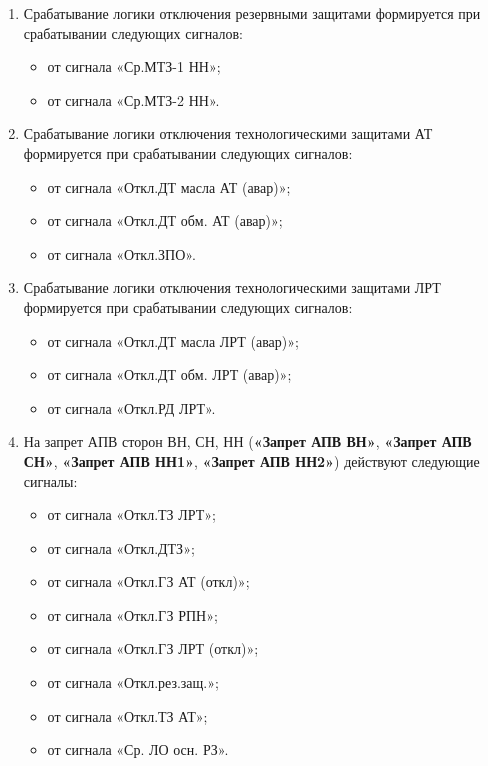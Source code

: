 \color{black}

\begin{enumerate}

\item
Срабатывание логики отключения резервными защитами формируется при срабатывании следующих сигналов:
\begin{itemize}
\item от сигнала «Ср.МТЗ-1 НН»;
\item от сигнала «Ср.МТЗ-2 НН».
\end{itemize}

\item
Срабатывание логики отключения технологическими защитами АТ формируется при срабатывании следующих сигналов:
\begin{itemize}
\item от сигнала «Откл.ДТ масла АТ (авар)»;
\item от сигнала «Откл.ДТ обм. АТ (авар)»;
\item от сигнала «Откл.ЗПО».
\end{itemize}

\item
Срабатывание логики отключения технологическими защитами ЛРТ формируется при срабатывании следующих сигналов:
\begin{itemize}
\item от сигнала «Откл.ДТ масла ЛРТ (авар)»;
\item от сигнала «Откл.ДТ обм. ЛРТ (авар)»;
\item от сигнала «Откл.РД ЛРТ».
\end{itemize}

\item
На запрет АПВ сторон ВН, СН, НН (\textbf{«Запрет АПВ ВН»}, \textbf{«Запрет АПВ СН»}, \textbf{«Запрет АПВ НН1»}, \textbf{«Запрет АПВ НН2»}) действуют следующие сигналы:
\begin{itemize}
\item от сигнала «Откл.ТЗ ЛРТ»;
\item от сигнала «Откл.ДТЗ»;
\item от сигнала «Откл.ГЗ АТ (откл)»;
\item от сигнала «Откл.ГЗ РПН»;
\item от сигнала «Откл.ГЗ ЛРТ (откл)»;
\item от сигнала «Откл.рез.защ.»;
\item от сигнала «Откл.ТЗ АТ»;
\item от сигнала «Ср. ЛО осн. РЗ».
\end{itemize}


\end{enumerate}
